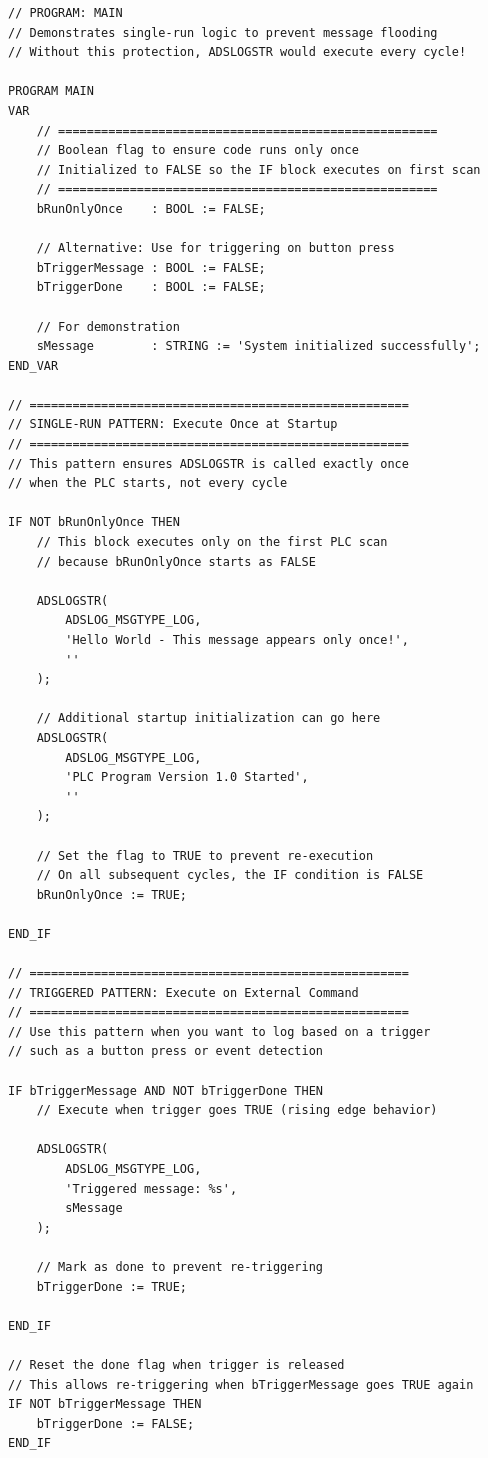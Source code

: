 \documentclass[11pt,a4paper]{article}
\begin{document}
\begin{lstlisting}
// PROGRAM: MAIN
// Demonstrates single-run logic to prevent message flooding
// Without this protection, ADSLOGSTR would execute every cycle!

PROGRAM MAIN
VAR
    // =====================================================
    // Boolean flag to ensure code runs only once
    // Initialized to FALSE so the IF block executes on first scan
    // =====================================================
    bRunOnlyOnce    : BOOL := FALSE;
    
    // Alternative: Use for triggering on button press
    bTriggerMessage : BOOL := FALSE;
    bTriggerDone    : BOOL := FALSE;
    
    // For demonstration
    sMessage        : STRING := 'System initialized successfully';
END_VAR

// =====================================================
// SINGLE-RUN PATTERN: Execute Once at Startup
// =====================================================
// This pattern ensures ADSLOGSTR is called exactly once
// when the PLC starts, not every cycle

IF NOT bRunOnlyOnce THEN
    // This block executes only on the first PLC scan
    // because bRunOnlyOnce starts as FALSE
    
    ADSLOGSTR(
        ADSLOG_MSGTYPE_LOG,
        'Hello World - This message appears only once!',
        ''
    );
    
    // Additional startup initialization can go here
    ADSLOGSTR(
        ADSLOG_MSGTYPE_LOG,
        'PLC Program Version 1.0 Started',
        ''
    );
    
    // Set the flag to TRUE to prevent re-execution
    // On all subsequent cycles, the IF condition is FALSE
    bRunOnlyOnce := TRUE;
    
END_IF

// =====================================================
// TRIGGERED PATTERN: Execute on External Command
// =====================================================
// Use this pattern when you want to log based on a trigger
// such as a button press or event detection

IF bTriggerMessage AND NOT bTriggerDone THEN
    // Execute when trigger goes TRUE (rising edge behavior)
    
    ADSLOGSTR(
        ADSLOG_MSGTYPE_LOG,
        'Triggered message: %s',
        sMessage
    );
    
    // Mark as done to prevent re-triggering
    bTriggerDone := TRUE;
    
END_IF

// Reset the done flag when trigger is released
// This allows re-triggering when bTriggerMessage goes TRUE again
IF NOT bTriggerMessage THEN
    bTriggerDone := FALSE;
END_IF
\end{lstlisting}
\end{document}
